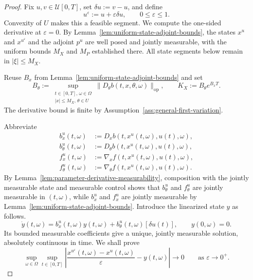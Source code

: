\documentclass[11pt]{amsart}
\numberwithin{equation}{section} %
\theoremstyle{remark}
\begin{document}
\begin{proof}
Fix $u,v\in\mathcal U[0,T]$, set $\delta u:=v-u$, and define
\[
u^\varepsilon:=u+\varepsilon\delta u,
\qquad 0\le\varepsilon\le1.
\]
Convexity of $U$ makes this a feasible segment. We compute the
one-sided derivative at $\varepsilon=0$. By
Lemma~\ref{lem:uniform-state-adjoint-bounds}, the states $x^u$ and
$x^{u^\varepsilon}$ and the adjoint $p^u$ are well posed and jointly
measurable, with the uniform bounds $M_X$ and $M_P$ established there.
All state segments below remain in $|\xi|\le M_X$.

Reuse $B_x$ from Lemma~\ref{lem:uniform-state-adjoint-bounds} and set
\[
B_\theta:=\sup_{\substack{t\in[0,T],\,\omega\in\Omega\\
 |x|\le M_X,\,\theta\in U}}
\|D_\theta b(t,x,\theta,\omega)\|_{\mathrm{op}},
\qquad K_X:=B_\theta e^{B_xT}.
\]
The derivative bound is finite by
Assumption~\ref{ass:general-first-variation}.

Abbreviate
\[
\begin{aligned}
b_x^u(t,\omega)&:=D_x b(t,x^u(t,\omega),u(t),\omega),\\
b_\theta^u(t,\omega)&:=D_\theta b(t,x^u(t,\omega),u(t),\omega),\\
f_x^u(t,\omega)&:=\nabla_x f(t,x^u(t,\omega),u(t),\omega),\\
f_\theta^u(t,\omega)&:=\nabla_\theta f(t,x^u(t,\omega),u(t),\omega).
\end{aligned}
\]
By Lemma~\ref{lem:parameter-derivative-measurability},
composition with the jointly measurable state and measurable
control shows that $b_\theta^u$ and $f_\theta^u$ are jointly
measurable in $(t,\omega)$, while $b_x^u$ and $f_x^u$ are
jointly measurable by
Lemma~\ref{lem:uniform-state-adjoint-bounds}.
Introduce the linearized state $y$ as follows. 
\begin{equation}
\label{eq:linearized-state}
\dot y(t,\omega)
=b_x^u(t,\omega)y(t,\omega)
+b_\theta^u(t,\omega)[\delta u(t)],
\qquad y(0,\omega)=0.
\end{equation}
Its bounded measurable coefficients give a unique, jointly measurable
solution, absolutely continuous in time. We shall prove
\begin{equation}
\label{eq:state-diff-quotient}
\sup_{\omega\in\Omega}\sup_{t\in[0,T]}
\left|
\frac{x^{u^\varepsilon}(t,\omega)-x^u(t,\omega)}{\varepsilon}
-y(t,\omega)
\right|\longrightarrow0
\qquad\text{as }\varepsilon\to0^+.
\end{equation}


\end{proof}
\end{document}
